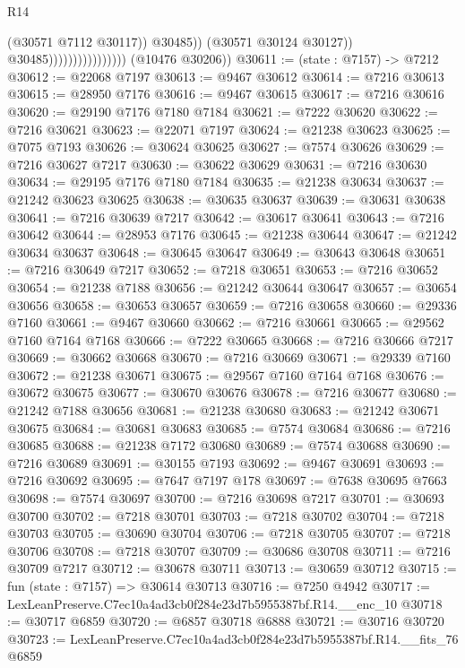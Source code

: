 \begin{lexlean}{R14}
\begin{coremodule}
                                              (@30571 @7112 @30117))
                                            @30485))
                                        (@30571 @30124 @30127))
                                      @30485))))))))))))))))
      (@10476 @30206))
@30611 := (state : @7157) -> @7212
@30612 := @22068 @7197
@30613 := @9467 @30612
@30614 := @7216 @30613
@30615 := @28950 @7176
@30616 := @9467 @30615
@30617 := @7216 @30616
@30620 := @29190 @7176 @7180 @7184
@30621 := @7222 @30620
@30622 := @7216 @30621
@30623 := @22071 @7197
@30624 := @21238 @30623
@30625 := @7075 @7193
@30626 := @30624 @30625
@30627 := @7574 @30626
@30629 := @7216 @30627 @7217
@30630 := @30622 @30629
@30631 := @7216 @30630
@30634 := @29195 @7176 @7180 @7184
@30635 := @21238 @30634
@30637 := @21242 @30623 @30625
@30638 := @30635 @30637
@30639 := @30631 @30638
@30641 := @7216 @30639 @7217
@30642 := @30617 @30641
@30643 := @7216 @30642
@30644 := @28953 @7176
@30645 := @21238 @30644
@30647 := @21242 @30634 @30637
@30648 := @30645 @30647
@30649 := @30643 @30648
@30651 := @7216 @30649 @7217
@30652 := @7218 @30651
@30653 := @7216 @30652
@30654 := @21238 @7188
@30656 := @21242 @30644 @30647
@30657 := @30654 @30656
@30658 := @30653 @30657
@30659 := @7216 @30658
@30660 := @29336 @7160
@30661 := @9467 @30660
@30662 := @7216 @30661
@30665 := @29562 @7160 @7164 @7168
@30666 := @7222 @30665
@30668 := @7216 @30666 @7217
@30669 := @30662 @30668
@30670 := @7216 @30669
@30671 := @29339 @7160
@30672 := @21238 @30671
@30675 := @29567 @7160 @7164 @7168
@30676 := @30672 @30675
@30677 := @30670 @30676
@30678 := @7216 @30677
@30680 := @21242 @7188 @30656
@30681 := @21238 @30680
@30683 := @21242 @30671 @30675
@30684 := @30681 @30683
@30685 := @7574 @30684
@30686 := @7216 @30685
@30688 := @21238 @7172 @30680
@30689 := @7574 @30688
@30690 := @7216 @30689
@30691 := @30155 @7193
@30692 := @9467 @30691
@30693 := @7216 @30692
@30695 := @7647 @7197 @178
@30697 := @7638 @30695 @7663
@30698 := @7574 @30697
@30700 := @7216 @30698 @7217
@30701 := @30693 @30700
@30702 := @7218 @30701
@30703 := @7218 @30702
@30704 := @7218 @30703
@30705 := @30690 @30704
@30706 := @7218 @30705
@30707 := @7218 @30706
@30708 := @7218 @30707
@30709 := @30686 @30708
@30711 := @7216 @30709 @7217
@30712 := @30678 @30711
@30713 := @30659 @30712
@30715 := fun (state : @7157) => @30614 @30713
@30716 := @7250 @4942
@30717 := LexLeanPreserve.C7ec10a4ad3cb0f284e23d7b5955387bf.R14.__enc_10
@30718 := @30717 @6859
@30720 := @6857 @30718 @6888
@30721 := @30716 @30720
@30723 := LexLeanPreserve.C7ec10a4ad3cb0f284e23d7b5955387bf.R14.__fits_76 @6859

\end{coremodule}
\end{lexlean}
